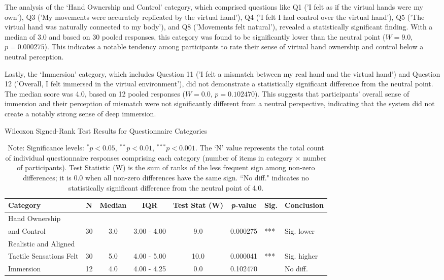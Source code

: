The analysis of the `Hand Ownership and Control' category, which comprised questions like Q1 ('I felt as if the virtual hands were my own'), Q3 ('My movements were accurately replicated by the virtual hand'), Q4 ('I felt I had control over the virtual hand'), Q5 ('The virtual hand was naturally connected to my body'), and Q8 ('Movements felt natural'), revealed a statistically significant finding. With a median of 3.0 and based on 30 pooled responses, this category was found to be significantly lower than the neutral point ($W=9.0$, $p=0.000275$). This indicates a notable tendency among participants to rate their sense of virtual hand ownership and control below a neutral perception.

Lastly, the `Immersion' category, which includes Question 11 ('I felt a mismatch between my real hand and the virtual hand') and Question 12 ('Overall, I felt immersed in the virtual environment'), did not demonstrate a statistically significant difference from the neutral point. The median score was 4.0, based on 12 pooled responses ($W=0.0$,  $p=0.102470$). This suggests that participants' overall sense of immersion and their perception of mismatch were not significantly different from a neutral perspective, indicating that the system did not create a notably strong sense of deep immersion.

\begin{table}[H]
    \centering
    \caption{Wilcoxon Signed-Rank Test Results for Questionnaire Categories}
    \label{tab:wilcoxon_category_results}
    \begin{tabular}{@{} p{2.5cm} c c c c S[table-format=1.6] l p{1.5cm} @{}}
        \toprule
        \textbf{Category} & \textbf{N} & \textbf{Median} & \textbf{IQR} & \textbf{Test Stat (W)} & \textbf{\textit{p}-value} & \textbf{Sig.} & \textbf{Conclusion} \\
        \midrule
        Hand Ownership \\ and Control & 30 & 3.0 & 3.00 - 4.00 & 9.0 & 0.000275 & *** & Sig. lower  \\
        \midrule
        Realistic and Aligned \\ Tactile Sensations Felt & 30 & 5.0 & 4.00 - 5.00 & 10.0 & 0.000041 & *** & Sig. higher  \\
        \midrule
        Immersion & 12 & 4.0 & 4.00 - 4.25 & 0.0 & 0.102470 & & No diff. \\
        \bottomrule
    \end{tabular}
    \caption*{Note: Significance levels: $^* p < 0.05$, $^{**} p < 0.01$, $^{***} p < 0.001$. The `N' value represents the total count of individual questionnaire responses comprising each category (number of items in category $\times$ number of participants). Test Statistic (W) is the sum of ranks of the less frequent sign among non-zero differences; it is 0.0 when all non-zero differences have the same sign. ``No diff." indicates no statistically significant difference from the neutral point of 4.0.}
\end{table}

